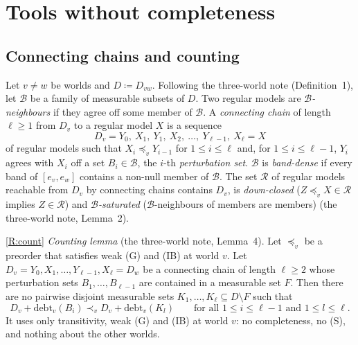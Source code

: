 \documentclass[11pt]{article}
\theoremstyle{definition}\newtheorem{definition}[theorem]{Definition}
\theoremstyle{remark}\newtheorem{remark}[theorem]{Remark}
\newcommand{\debt}{\mathrm{debt}}
\newcommand{\Bfam}{\mathcal B}
\begin{document}
\section{Tools without completeness}\label{sec:tools}

\subsection{Connecting chains and counting}\label{sec:count}

Let $v\ne w$ be worlds and $D\coloneqq D_{vw}$. Following the three-world
note (Definition~1), let $\Bfam$ be a family of measurable subsets of $D$.
Two regular models are \emph{$\Bfam$-neighbours} if they agree off some
member of $\Bfam$. A \emph{connecting chain} of length $\ell\ge1$ from $D_v$
to a regular model $X$ is a sequence
\[
 D_v=Y_0,\ X_1,\ Y_1,\ X_2,\ \dots,\ Y_{\ell-1},\ X_\ell=X
\]
of regular models such that $X_i\preceq_vY_{i-1}$ for $1\le i\le\ell$ and,
for $1\le i\le\ell-1$, $Y_i$ agrees with $X_i$ off a set $B_i\in\Bfam$, the
$i$-th \emph{perturbation set}. $\Bfam$ is \emph{band-dense} if every band of
$[e_v,e_w]$ contains a non-null member of $\Bfam$. The set $\mathcal R$ of
regular models reachable from $D_v$ by connecting chains contains $D_v$, is
\emph{down-closed} ($Z\preceq_vX\in\mathcal R$ implies $Z\in\mathcal R$) and
\emph{$\Bfam$-saturated} ($\Bfam$-neighbours of members are members) (the
three-world note, Lemma~2).

\ref{R:count} \emph{Counting lemma} (the three-world note, Lemma~4). Let
$\preceq_v$ be a preorder that satisfies weak (G) and (IB) at world $v$. Let
$D_v=Y_0,X_1,\dots,Y_{\ell-1},X_\ell=D_w$ be a connecting chain of length
$\ell\ge2$ whose perturbation sets $B_1,\dots,B_{\ell-1}$ are contained in a
measurable set $F$. Then there are no pairwise disjoint measurable sets
$K_1,\dots,K_\ell\subseteq D\setminus F$ such that
\begin{equation}
 D_v+\debt_v(B_i)\prec_vD_v+\debt_v(K_l)\qquad
 \text{for all }1\le i\le\ell-1\text{ and }1\le l\le\ell.
 \label{eq:heavy}
\end{equation}
It uses only transitivity, weak (G) and (IB) at world $v$: no completeness,
no (S), and nothing about the other worlds.
\end{document}
